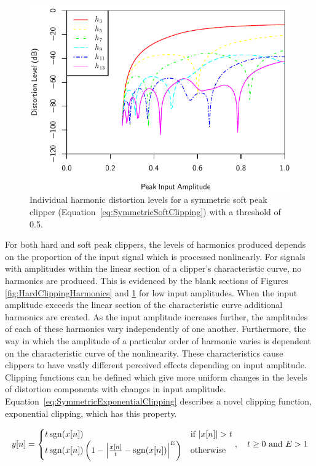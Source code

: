 			\begin{figure}[h!]
				\centering
				\includegraphics{chapter5/Images/SoftClippingHarmonics.pdf}
				\caption{Individual harmonic distortion levels for a symmetric soft peak clipper
					 (Equation~\ref{eq:SymmetricSoftClipping}) with a threshold of 0.5.}
				\label{fig:SoftClippingHarmonics}
			\end{figure}

			For both hard and soft peak clippers, the levels of harmonics produced depends on the proportion of
			the input signal which is processed nonlinearly. For signals with amplitudes within the linear
			section of a clipper's characteristic curve, no harmonics are produced. This is evidenced by the
			blank sections of Figures \ref{fig:HardClippingHarmonics} and \ref{fig:SoftClippingHarmonics} for
			low input amplitudes. When the input amplitude exceeds the linear section of the characteristic
			curve additional harmonics are created. As the input amplitude increases further, the amplitudes of
			each of these harmonics vary independently of one another. Furthermore, the way in which the
			amplitude of a particular order of harmonic varies is dependent on the characteristic curve of the
			nonlinearity. These characteristics cause clippers to have vastly different perceived effects
			depending on input amplitude. Clipping functions can be defined which give more uniform changes in
			the levels of distortion components with changes in input amplitude.
			Equation~\ref{eq:SymmetricExponentialClipping} describes a novel clipping function, exponential
			clipping, which has this property.
			
			\begin{equation}
				y[n] = \begin{cases}
					t\operatorname{sgn}(x[n]) & \text{if $\left|x[n]\right| > t$} \\
					t\operatorname{sgn}(x[n]) \left(1 - \left|\frac{x[n]}{t} - \operatorname{sgn}(x[n])\right|^{E} \right) &
						\text{otherwise}
				\end{cases}, \quad t \geq 0 \ \text{and} \ E > 1
				\label{eq:SymmetricExponentialClipping}
			\end{equation}

